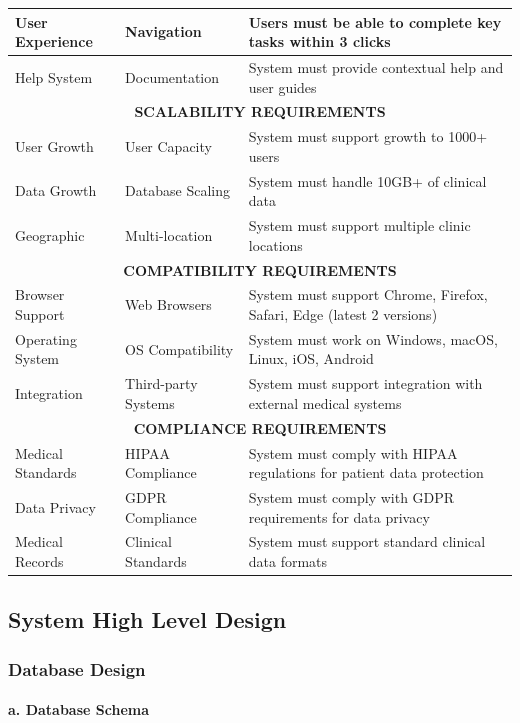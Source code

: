 \documentclass[12pt,a4paper]{article}
\begin{document}
\begin{longtable}{|p{2cm}|p{3cm}|p{9cm}|}
\hline
User Experience & Navigation & Users must be able to complete key tasks within 3 clicks \\
\hline
Help System & Documentation & System must provide contextual help and user guides \\
\hline
\multicolumn{3}{|c|}{\textbf{SCALABILITY REQUIREMENTS}} \\
\hline
User Growth & User Capacity & System must support growth to 1000+ users \\
\hline
Data Growth & Database Scaling & System must handle 10GB+ of clinical data \\
\hline
Geographic & Multi-location & System must support multiple clinic locations \\
\hline
\multicolumn{3}{|c|}{\textbf{COMPATIBILITY REQUIREMENTS}} \\
\hline
Browser Support & Web Browsers & System must support Chrome, Firefox, Safari, Edge (latest 2 versions) \\
\hline
Operating System & OS Compatibility & System must work on Windows, macOS, Linux, iOS, Android \\
\hline
Integration & Third-party Systems & System must support integration with external medical systems \\
\hline
\multicolumn{3}{|c|}{\textbf{COMPLIANCE REQUIREMENTS}} \\
\hline
Medical Standards & HIPAA Compliance & System must comply with HIPAA regulations for patient data protection \\
\hline
Data Privacy & GDPR Compliance & System must comply with GDPR requirements for data privacy \\
\hline
Medical Records & Clinical Standards & System must support standard clinical data formats \\
\hline
\end{longtable}

\subsection{System High Level Design}

\subsubsection{Database Design}

\paragraph{a. Database Schema}
\end{document}

